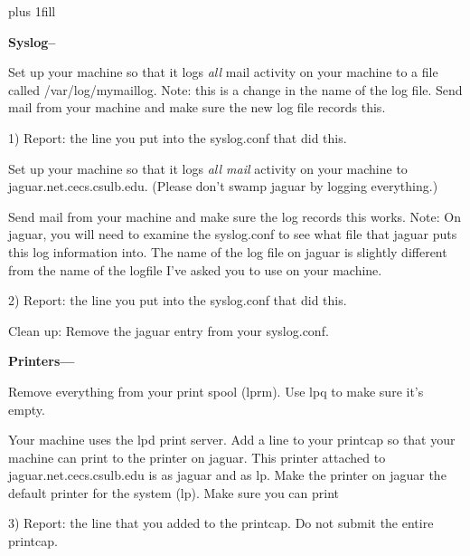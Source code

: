 
\rightskip=0pt plus 1fill

\parindent 0pt

{\bf Syslog--}

Set up your machine so that it logs {\it  all} mail activity 
on your machine to a file called {\ltt{}/var/log/mymaillog}.
Note: this is a change in the name of the log file.
Send mail from your machine and make sure the new log file records this.

1) Report: the line you put into the syslog.conf that did this.

Set up your machine so that it logs {\it all mail} activity 
on your machine to 
{\ltt{}jaguar.net.cecs.csulb.edu}.
(Please don't swamp jaguar by logging everything.)

Send mail from your machine and make sure the log records this works.
Note: On {\ltt{}jaguar}, you will need to examine the {\ltt{}syslog.conf}
to see what file that {\ltt{}jaguar} puts this log information into.
The name of the log file on jaguar is slightly different from
the name of the logfile I've asked you to use on your machine.

2) Report: the line you put into the syslog.conf that did this.

Clean up: Remove the {\ltt{}jaguar} entry from your {\ltt{}syslog.conf}.

{\bf Printers---}


Remove everything from your print spool ({\ltt{}lprm}).
Use {\ltt{}lpq} to make sure it's empty.

Your machine uses the lpd print server.
Add a line to your printcap so that your machine can
print to the printer on jaguar.
This printer attached to {\ltt{}jaguar.net.cecs.csulb.edu} is
as {\ltt{}jaguar} and as {\ltt{}lp}.
Make the printer on {\ltt{}jaguar} the default printer for the system 
({\ltt{}lp}).
Make sure you can print

3) Report: the line that you added to the printcap. 
Do not submit the entire printcap.



\bye
